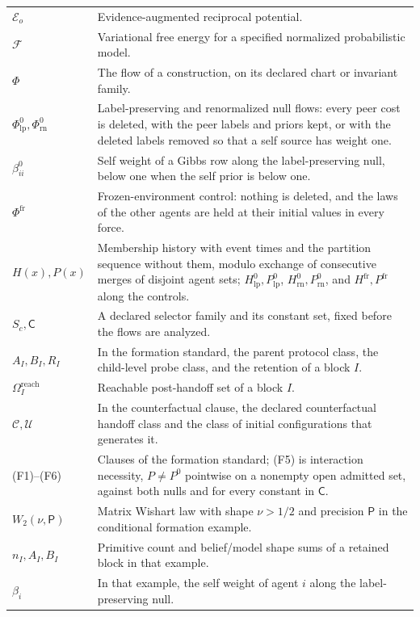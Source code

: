 \begin{longtable}{@{}p{}p{}@{}}
$\mathcal E_o$ & Evidence-augmented reciprocal potential. \\
$\mathcal F$ & Variational free energy for a specified normalized probabilistic model. \\
$\Phi$ & The flow of a construction, on its declared chart or invariant family. \\
$\Phi^0_{\mathrm{lp}},\Phi^0_{\mathrm{rn}}$ & Label-preserving and renormalized null flows: every peer cost is deleted, with the peer labels and priors kept, or with the deleted labels removed so that a self source has weight one. \\
$\beta^0_{ii}$ & Self weight of a Gibbs row along the label-preserving null, below one when the self prior is below one. \\
$\Phi^{\mathrm{fr}}$ & Frozen-environment control: nothing is deleted, and the laws of the other agents are held at their initial values in every force. \\
$H(x),P(x)$ & Membership history with event times and the partition sequence without them, modulo exchange of consecutive merges of disjoint agent sets; $H^0_{\mathrm{lp}},P^0_{\mathrm{lp}}$, $H^0_{\mathrm{rn}},P^0_{\mathrm{rn}}$, and $H^{\mathrm{fr}},P^{\mathrm{fr}}$ along the controls. \\
$S_c,\mathsf C$ & A declared selector family and its constant set, fixed before the flows are analyzed. \\
$A_I,B_I,R_I$ & In the formation standard, the parent protocol class, the child-level probe class, and the retention of a block $I$. \\
$\Omega_I^{\mathrm{reach}}$ & Reachable post-handoff set of a block $I$. \\
$\mathcal C,\mathcal U$ & In the counterfactual clause, the declared counterfactual handoff class and the class of initial configurations that generates it. \\
(F1)--(F6) & Clauses of the formation standard; (F5) is interaction necessity, $P\neq P^0$ pointwise on a nonempty open admitted set, against both nulls and for every constant in $\mathsf C$. \\
$W_2(\nu,\mathsf P)$ & Matrix Wishart law with shape $\nu>1/2$ and precision $\mathsf P$ in the conditional formation example. \\
$n_I,A_I,B_I$ & Primitive count and belief/model shape sums of a retained block in that example. \\
$\beta_i$ & In that example, the self weight of agent $i$ along the label-preserving null. \\

\end{longtable}

